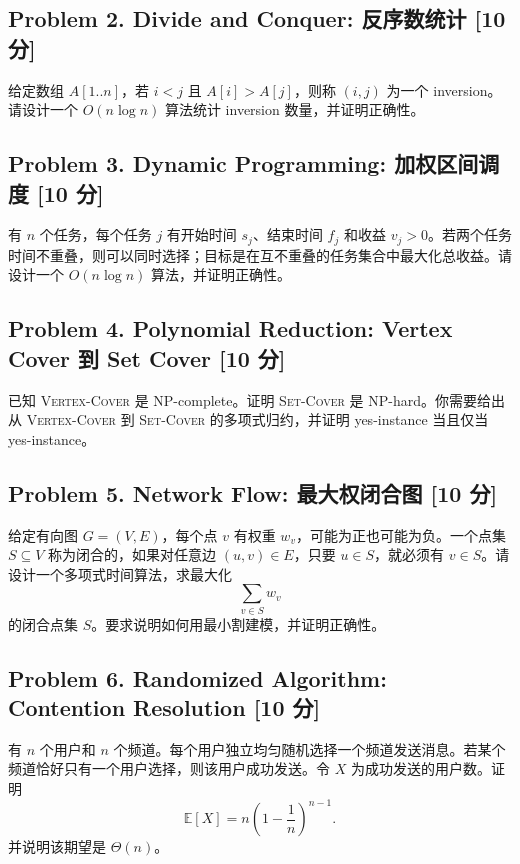 \documentclass[UTF8,a4paper,11pt]{ctexart}
\newcommand{\points}[1]{\hfill{\small\textbf{[#1 分]}}}
\begin{document}
\subsection*{Problem 2. Divide and Conquer: 反序数统计 \points{10}}

给定数组 $A[1..n]$，若 $i<j$ 且 $A[i]>A[j]$，则称 $(i,j)$ 为一个 inversion。请设计一个 $O(n\log n)$ 算法统计 inversion 数量，并证明正确性。

\subsection*{Problem 3. Dynamic Programming: 加权区间调度 \points{10}}

有 $n$ 个任务，每个任务 $j$ 有开始时间 $s_j$、结束时间 $f_j$ 和收益 $v_j>0$。若两个任务时间不重叠，则可以同时选择；目标是在互不重叠的任务集合中最大化总收益。请设计一个 $O(n\log n)$ 算法，并证明正确性。

\subsection*{Problem 4. Polynomial Reduction: Vertex Cover 到 Set Cover \points{10}}

已知 \textsc{Vertex-Cover} 是 NP-complete。证明 \textsc{Set-Cover} 是 NP-hard。你需要给出从 \textsc{Vertex-Cover} 到 \textsc{Set-Cover} 的多项式归约，并证明 yes-instance 当且仅当 yes-instance。

\subsection*{Problem 5. Network Flow: 最大权闭合图 \points{10}}

给定有向图 $G=(V,E)$，每个点 $v$ 有权重 $w_v$，可能为正也可能为负。一个点集 $S\subseteq V$ 称为闭合的，如果对任意边 $(u,v)\in E$，只要 $u\in S$，就必须有 $v\in S$。请设计一个多项式时间算法，求最大化
\[
\sum_{v\in S}w_v
\]
的闭合点集 $S$。要求说明如何用最小割建模，并证明正确性。

\subsection*{Problem 6. Randomized Algorithm: Contention Resolution \points{10}}

有 $n$ 个用户和 $n$ 个频道。每个用户独立均匀随机选择一个频道发送消息。若某个频道恰好只有一个用户选择，则该用户成功发送。令 $X$ 为成功发送的用户数。证明
\[
\mathbb E[X]=n\left(1-\frac1n\right)^{n-1}.
\]
并说明该期望是 $\Theta(n)$。
\end{document}

